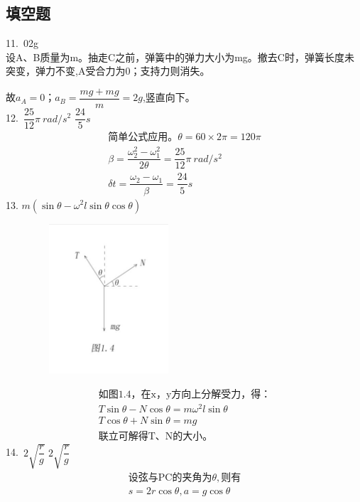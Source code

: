 \documentclass[blue, normal]{./templete/qyxfnote}
\begin{document}
\begin{multicols}{2}
		\subsection{填空题}
		11.\ 0\qquad2g\\
		\indent
		设A、B质量为m。抽走C之前，弹簧中的弹力大小为mg。撤去C时，弹簧长度未突变，弹力不变,A受合力为0；支持力则消失。\par
		故$a_A=0；a_B=\dfrac{mg+mg}{m}=2g$,竖直向下。\\
		12.\ $\dfrac{25}{12}\pi\ rad/s^2$ \qquad$\dfrac{24}{5}s$
		\begin{gather*}
		\text{简单公式应用。}\theta=60\times2\pi=120\pi\\
		\beta=\dfrac{\omega_2^2-\omega_1^2}{2\theta}=\dfrac{25}{12}\pi\ rad/s^2\\
		\delta t=\dfrac{\omega_2-\omega_1}{\beta}=\dfrac{24}{5}s
		\end{gather*}
		13. $m(\sin\theta-\omega^2l\sin\theta\cos\theta)$
		\vspace{-1em}
		\begin{figure}[htbp]
			\centering
			\includegraphics[width=15em, height=15em]{Chp1_illus4.png}
			\label{fig:c1}
		\end{figure}
		\vspace{-3em}
		\begin{gather*}
		\text{如图1.4，在x，y方向上分解受力，得：}\\		
		T\sin\theta-N\cos\theta=m\omega^2l\sin\theta\\
		T\cos\theta+N\sin\theta=mg\\
		\text{联立可解得T、N的大小。}
		\end{gather*}
		14.\ $2\sqrt{\dfrac{r}{g}}$ \qquad $2\sqrt{\dfrac{r}{g}}$
		\vspace{-0.5em}
		\begin{gather*}
		\text{设弦与PC的夹角为}\theta,\text{则有}\\
		s=2r\cos\theta,a=g\cos\theta\\

\end{gather*}
\end{multicols}
\end{document}
